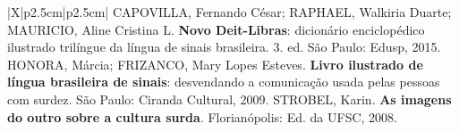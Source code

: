\begin{xltabular}{\linewidth}{|X|p{2.5cm}|p{2.5cm}|}
{{CAPOVILLA, Fernando César; RAPHAEL, Walkiria Duarte; MAURICIO, Aline Cristina L. \textbf{Novo Deit-Libras}: dicionário enciclopédico ilustrado trilíngue da língua de sinais brasileira. 3. ed. São Paulo: Edusp, 2015. \newline
HONORA, Márcia; FRIZANCO, Mary Lopes Esteves. \textbf{Livro ilustrado de língua brasileira de sinais}: desvendando a comunicação usada pelas pessoas com surdez. São Paulo: Ciranda Cultural, 2009. \newline
STROBEL, Karin. \textbf{As imagens do outro sobre a cultura surda}. Florianópolis: Ed. da UFSC, 2008.}} \\ \hline
\end{xltabular}

\clearpage
